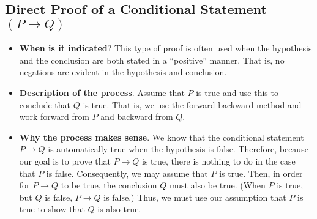 \subsection*{Direct Proof of a Conditional Statement   $\left( P \to Q \right)$}
%
%

\begin{itemize}
\item \textbf{When is it indicated}?  This type of proof is often used when the hypothesis and the conclusion are both stated in  a ``positive'' manner.  That is, no negations are evident in the hypothesis and conclusion.  

\item \textbf{Description of the process}.  Assume that  $P$  is true and use this to conclude that  $Q$  is true.  That is, we use the forward-backward method and work forward from  $P$  and backward from  $Q$.

\item \textbf{Why the process makes sense}.  We know that the conditional statement  $P \to Q$  is automatically true when the hypothesis is false.  Therefore, because our goal is to prove that  $P \to Q$  is true, there is nothing to do in the case that  $P$  is false.  Consequently, we may assume that  $P$  is true.  Then, in order for  $P \to Q$  to be true,  the conclusion  $Q$  must also be true.  (When  $P$  is true, but  $Q$ is false, $P \to Q$  is false.)  Thus, we must use our assumption that  $P$  is true to show that  $Q$  is also true.
\end{itemize}

\endinput
